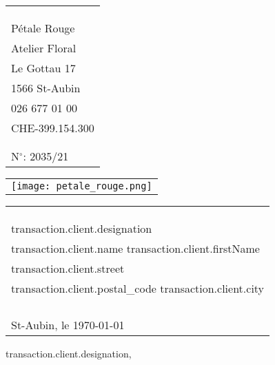 \documentclass[11pt]{article}
\begin{document}
\begin{tabular}[t]{@{}l}
\\
\\
\\
\\
  Pétale Rouge \\
Atelier Floral  \\
 Le Gottau 17 \\
1566 St-Aubin \\
026 677 01 00 \\
CHE-399.154.300  \\
 \\
 \\
N$^\circ$: 2035/21
\end{tabular}
\hfill%
\begin{tabular}[t]{l@{}}
\\
\texttt{[image: petale\_rouge.png]}
\end{tabular}
\hfill
\begin{tabular}[t]{l@{}}
\\
\\
\\
\\
{{transaction.client.designation }}\\
{{transaction.client.name }} {{transaction.client.firstName }} \\
{{transaction.client.street}} \\
{{transaction.client.postal_code }} {{transaction.client.city }}\\
\\
\\
\\
\\
 St-Aubin, le \today
\end{tabular}
\vskip 5mm
{{transaction.client.designation}},
\vskip 5mm
\end{document}
